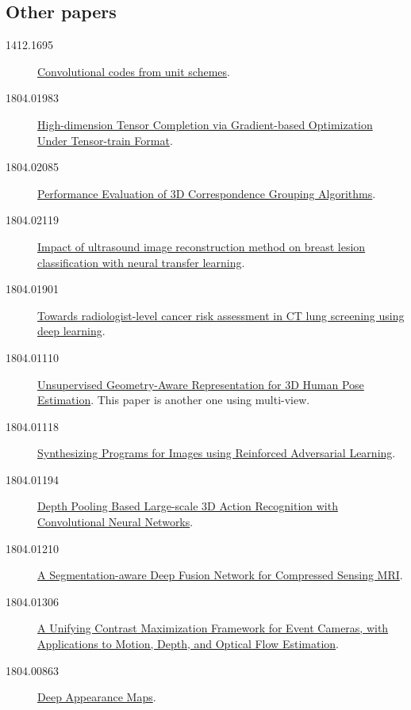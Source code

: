 \subsection{Other papers}
\begin{description}
\item[1412.1695]  \href{https://arxiv.org/abs/1412.1695}{Convolutional codes
    from unit schemes}.

\item[1804.01983] \href{https://arxiv.org/abs/1804.01983}{High-dimension Tensor
    Completion via Gradient-based Optimization Under Tensor-train Format}.

\item[1804.02085] \href{https://arxiv.org/abs/1804.02085}{Performance Evaluation
    of 3D Correspondence Grouping Algorithms}.

\item[1804.02119] \href{https://arxiv.org/abs/1804.02119}{Impact of ultrasound
    image reconstruction method on breast lesion classification with neural
    transfer learning}.

\item[1804.01901] \href{https://arxiv.org/abs/1804.01901}{Towards
    radiologist-level cancer risk assessment in CT lung screening using deep
    learning}.

\item[1804.01110] \href{https://arxiv.org/abs/1804.01110}{Unsupervised
    Geometry-Aware Representation for 3D Human Pose Estimation}. This paper is
  another one using multi-view.
  
\item[1804.01118] \href{https://arxiv.org/abs/1804.01118}{Synthesizing Programs
    for Images using Reinforced Adversarial Learning}.

\item[1804.01194] \href{https://arxiv.org/abs/1804.01194}{Depth Pooling Based
    Large-scale 3D Action Recognition with Convolutional Neural Networks}.

\item[1804.01210] \href{https://arxiv.org/abs/1804.01210}{A Segmentation-aware
    Deep Fusion Network for Compressed Sensing MRI}.

\item[1804.01306] \href{https://arxiv.org/abs/1804.01306}{A Unifying Contrast
    Maximization Framework for Event Cameras, with Applications to Motion,
    Depth, and Optical Flow Estimation}.

\item[1804.00863] \href{https://arxiv.org/abs/1804.00863}{Deep Appearance Maps}.


\end{description}
